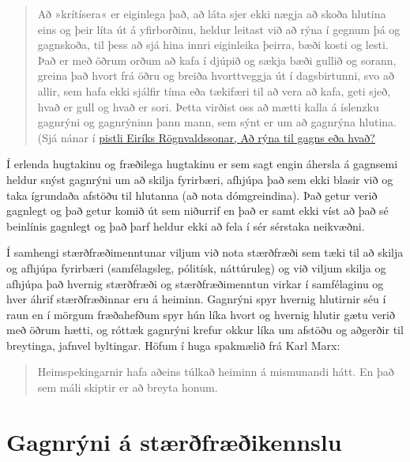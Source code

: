 \documentclass[
  icelandic,
]{book}
\theoremstyle{definition}
\theoremstyle{definition}
\theoremstyle{definition}
\theoremstyle{definition}
\theoremstyle{remark}
\begin{document}
\begin{quote}
Að »krítísera« er eiginlega það, að láta sjer ekki nægja að skoða hlutina eins og þeir líta út á yfirborðinu, heldur leitast við að rýna í gegnum þá og gagnskoða, til þess að sjá hina innri eiginleika þeirra, bæði kosti og lesti. Það er með öðrum orðum að kafa í djúpið og sækja bæði gullið og sorann, greina það hvort frá öðru og breiða hvorttveggja út í dagsbirtunni, svo að allir, sem hafa ekki sjálfir tíma eða tækifæri til að vera að kafa, geti sjeð, hvað er gull og hvað er sori. Þetta virðist oss að mætti kalla á íslenzku gagnrýni og gagnrýninn þann mann, sem sýnt er um að gagnrýna hlutina. (Sjá nánar í \href{https://uni.hi.is/eirikur/2023/09/27/ad-ryna-til-gagns-eda-hvad/}{pistli Eiríks Rögnvaldssonar, Að rýna til gagns eða hvað?}
\end{quote}

Í erlenda hugtakinu og fræðilega hugtakinu er sem sagt engin áhersla á gagnsemi heldur snýst gagnrýni um að skilja fyrirbæri, afhjúpa það sem ekki blasir við og taka ígrundaða afstöðu til hlutanna (að nota dómgreindina). Það getur verið gagnlegt og það getur komið út sem niðurrif en það er samt ekki víst að það sé beinlínis gagnlegt og það þarf heldur ekki að fela í sér sérstaka neikvæðni.

Í samhengi stærðfræðimenntunar viljum við nota stærðfræði sem tæki til að skilja og afhjúpa fyrirbæri (samfélagsleg, pólitísk, náttúruleg) og við viljum skilja og afhjúpa það hvernig stærðfræði og stærðfræðimenntun virkar í samfélaginu og hver áhrif stærðfræðinnar eru á heiminn. Gagnrýni spyr hvernig hlutirnir séu í raun en í mörgum fræðahefðum spyr hún líka hvort og hvernig hlutir gætu verið með öðrum hætti, og róttæk gagnrýni krefur okkur líka um afstöðu og aðgerðir til breytinga, jafnvel byltingar. Höfum í huga spakmælið frá Karl Marx:

\begin{quote}
Heimspekingarnir hafa aðeins túlkað heiminn á mismunandi hátt. En það sem máli skiptir er að breyta honum.
\end{quote}

\section{Gagnrýni á stærðfræðikennslu}\label{gagnryni_kennslu}
\end{document}
